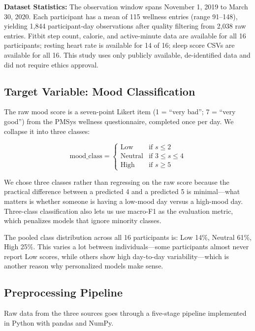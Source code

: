 \documentclass[conference]{IEEEtran}
\begin{document}
\textbf{Dataset Statistics:} The observation window spans November 1, 2019 to March 30, 2020.
Each participant has a mean of 115 wellness entries (range 91--148), yielding 1,844
participant-day observations after quality filtering from 2,038 raw entries.
Fitbit step count, calorie, and active-minute data are available for all 16 participants;
resting heart rate is available for 14 of 16; sleep score CSVs are available for all 16.
This study uses only publicly available, de-identified data and did not require ethics approval.

\subsection{Target Variable: Mood Classification}

The raw mood score is a seven-point Likert item (1 = ``very bad''; 7 = ``very good'')
from the PMSys wellness questionnaire, completed once per day. We collapse it into three
classes:

\begin{equation}
\text{mood\_class} =
\begin{cases}
\text{Low}     & \text{if } s \leq 2 \\
\text{Neutral} & \text{if } 3 \leq s \leq 4 \\
\text{High}    & \text{if } s \geq 5
\end{cases}
\label{eq:mood_class}
\end{equation}

We chose three classes rather than regressing on the raw score because the practical
difference between a predicted 4 and a predicted 5 is minimal---what matters is whether
someone is having a low-mood day versus a high-mood day. Three-class classification
also lets us use macro-F1 as the evaluation metric, which penalizes models that
ignore minority classes.

The pooled class distribution across all 16 participants is: Low 14\%, Neutral 61\%,
High 25\%. This varies a lot between individuals---some participants almost never
report Low scores, while others show high day-to-day variability---which is another
reason why personalized models make sense.

\subsection{Preprocessing Pipeline}

Raw data from the three sources goes through a five-stage pipeline implemented
in Python with pandas and NumPy.
\end{document}
